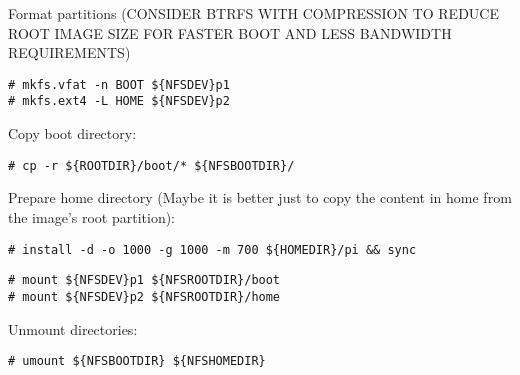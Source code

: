 Format partitions (CONSIDER BTRFS WITH COMPRESSION TO REDUCE ROOT IMAGE SIZE
FOR FASTER BOOT AND LESS BANDWIDTH REQUIREMENTS)
\begin{lstlisting}[]
# mkfs.vfat -n BOOT ${NFSDEV}p1
# mkfs.ext4 -L HOME ${NFSDEV}p2
\end{lstlisting}
\FloatBarrier
\vspace{-5mm}








Copy boot directory:
\begin{lstlisting}[]
# cp -r ${ROOTDIR}/boot/* ${NFSBOOTDIR}/ 
\end{lstlisting}
\FloatBarrier
\vspace{-5mm}



Prepare home directory (Maybe it is better just to copy the content in home from the
image's root partition):
\begin{lstlisting}[]
# install -d -o 1000 -g 1000 -m 700 ${HOMEDIR}/pi && sync
\end{lstlisting}
\FloatBarrier
\vspace{-5mm}



\begin{lstlisting}[]
# mount ${NFSDEV}p1 ${NFSROOTDIR}/boot
# mount ${NFSDEV}p2 ${NFSROOTDIR}/home
\end{lstlisting}
\FloatBarrier
\vspace{-5mm}


Unmount directories:
\begin{lstlisting}[]
# umount ${NFSBOOTDIR} ${NFSHOMEDIR}
\end{lstlisting}
\FloatBarrier
\vspace{-5mm}

